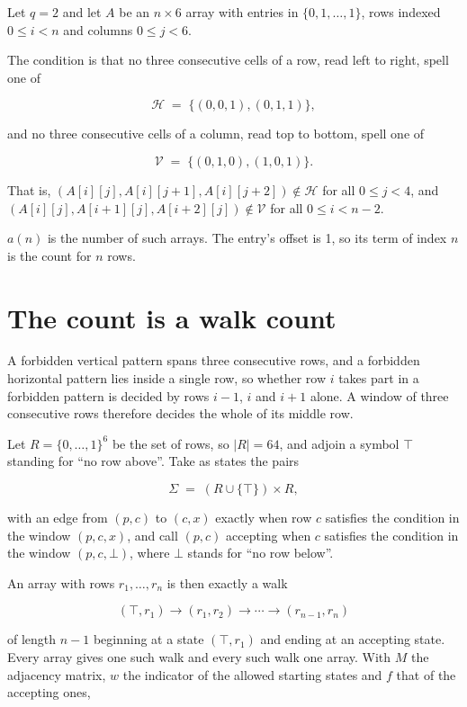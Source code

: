 \documentclass[11pt]{article}
\theoremstyle{definition}
\begin{document}
Let $q = 2$ and let $A$ be an $n \times 6$ array with entries in $\{0,1,\dots,1\}$, rows indexed $0 \le i < n$ and columns $0 \le j < 6$.

The condition is that no three consecutive cells of a row, read left to right, spell one of

\[\mathcal{H} \;=\; \{(0,0,1), (0,1,1)\},\]

and no three consecutive cells of a column, read top to bottom, spell one of

\[\mathcal{V} \;=\; \{(0,1,0), (1,0,1)\}.\]

That is, $(A[i][j],A[i][j{+}1],A[i][j{+}2]) \notin \mathcal{H}$ for all $0 \le j < 4$, and $(A[i][j],A[i{+}1][j],A[i{+}2][j]) \notin \mathcal{V}$ for all $0 \le i < n-2$.

$a(n)$ is the number of such arrays. The entry's offset is 1, so its term of index $n$ is the count for $n$ rows.

\section{The count is a walk count}

A forbidden vertical pattern spans three consecutive rows, and a forbidden horizontal pattern lies inside a single row, so whether row $i$ takes part in a forbidden pattern is decided by rows $i-1$, $i$ and $i+1$ alone. A window of three consecutive rows therefore decides the whole of its middle row.

Let $R = \{0,\dots,1\}^{6}$ be the set of rows, so $|R| = 64$, and adjoin a symbol $\top$ standing for ``no row above''. Take as states the pairs

\[\Sigma \;=\; (R \cup \{\top\}) \times R,\]

with an edge from $(p,c)$ to $(c,x)$ exactly when row $c$ satisfies the condition in the window $(p,c,x)$, and call $(p,c)$ accepting when $c$ satisfies the condition in the window $(p,c,\bot)$, where $\bot$ stands for ``no row below''.

An array with rows $r_1,\dots,r_n$ is then exactly a walk

\[(\top,r_1) \to (r_1,r_2) \to \cdots \to (r_{n-1},r_n)\]

of length $n-1$ beginning at a state $(\top,r_1)$ and ending at an accepting state. Every array gives one such walk and every such walk one array. With $M$ the adjacency matrix, $w$ the indicator of the allowed starting states and $f$ that of the accepting ones,
\end{document}
